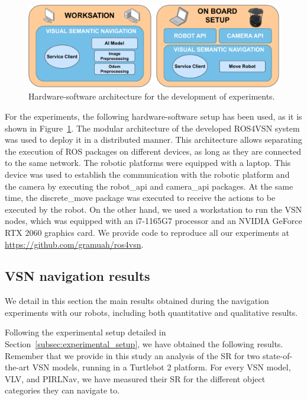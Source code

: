 \begin{figure}
    \centering
        \includegraphics[width=\linewidth]{figures/ros4vsn/hw-sw-scheme}
        \caption{Hardware-software architecture for the development of experiments.}
        \label{fig:setup_experiment}
\end{figure}

For the experiments, the following hardware-software setup has been used, as it is shown in Figure~\ref{fig:setup_experiment}.
The modular architecture of the developed ROS4VSN system was used to deploy it in a distributed manner.
This architecture allows separating the execution of ROS packages on different devices, as long as they are connected to the same network.
The robotic platforms were equipped with a laptop.
This device was used to establish the communication with the robotic platform and the camera by executing the robot\_api and camera\_api packages.
At the same time, the discrete\_move package was executed to receive the actions to be executed by the robot.
On the other hand, we used a workstation to run the VSN nodes, which was equipped with an i7-1165G7 processor and an NVIDIA GeForce RTX 2060 graphics card.
We provide code to reproduce all our experiments at \url{https://github.com/gramuah/ros4vsn}.


\subsection{VSN navigation results}
\label{subsec:vsn}
We detail in this section the main results obtained during the navigation experiments with our robots, including both quantitative and qualitative results.

Following the experimental setup detailed in Section~\ref{subsec:experimental_setup}, we have obtained the following results.
Remember that we provide in this study an analysis of the SR for two state-of-the-art VSN models, running in a Turtlebot 2 platform.
For every VSN model, \ie VLV, and PIRLNav, we have measured their SR for the different object categories they can navigate to.

